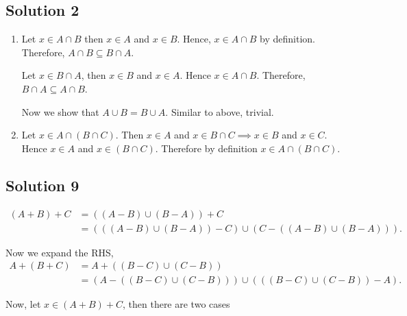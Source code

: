 \subsection{Solution 2}

\begin{enumerate}
  \item Let \( x \in A \cap B \) then \( x \in  A \) and \( x \in  B \).
    Hence, \( x \in  A \cap B \) by definition. Therefore, \( A \cap  B \subseteq B \cap  A \).

    Let \( x \in  B \cap A \), then \( x \in  B \) and \( x \in  A \). Hence \( x \in  A \cap  B \).
    Therefore, \( B \cap A \subseteq A \cap  B \).

    Now we show that \( A \cup  B = B \cup  A \). Similar to above, trivial.

  \item Let \( x \in  A \cap \left(B \cap  C  \right) \). Then \( x \in  A \) and \( x \in B \cap C \implies x \in B \) and \( x \in  C. \) Hence
    \( x \in  A \) and \( x \in  \left( B \cap  C  \right) \). Therefore by definition \( x \in  A \cap \left( B \cap  C \right) \).
\end{enumerate}

\subsection{Solution 9}

  \begin{align*}
    \left(A + B  \right) + C &= \left( \left( A - B \right) \cup \left( B - A \right) \right) + C \\
    &= \left( \left( \left( A - B \right) \cup \left( B - A \right) \right) - C \right) \cup \left( C - \left( \left( A - B  \right) \cup \left( B- A \right) \right) \right)
  .\end{align*}

  Now we expand the RHS,
  \begin{align*}
    A + \left( B + C \right) &= A + \left( \left( B - C \right) \cup  \left( C - B \right) \right) \\
    &= \left( A - \left( \left( B - C \right) \cup  \left( C - B \right) \right) \right) \cup \left( \left( \left( B - C \right) \cup  \left( C - B \right) \right) - A \right)
  .\end{align*}

  Now, let \( x \in \left( A + B \right) + C \), then there are two cases 

